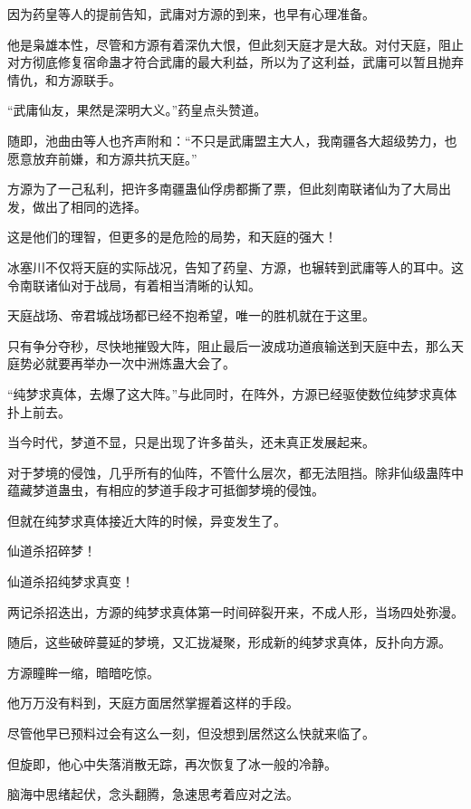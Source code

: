 
\begin{this_body}

因为药皇等人的提前告知，武庸对方源的到来，也早有心理准备。

他是枭雄本性，尽管和方源有着深仇大恨，但此刻天庭才是大敌。对付天庭，阻止对方彻底修复宿命蛊才符合武庸的最大利益，所以为了这利益，武庸可以暂且抛弃情仇，和方源联手。

“武庸仙友，果然是深明大义。”药皇点头赞道。

随即，池曲由等人也齐声附和：“不只是武庸盟主大人，我南疆各大超级势力，也愿意放弃前嫌，和方源共抗天庭。”

方源为了一己私利，把许多南疆蛊仙俘虏都撕了票，但此刻南联诸仙为了大局出发，做出了相同的选择。

这是他们的理智，但更多的是危险的局势，和天庭的强大！

冰塞川不仅将天庭的实际战况，告知了药皇、方源，也辗转到武庸等人的耳中。这令南联诸仙对于战局，有着相当清晰的认知。

天庭战场、帝君城战场都已经不抱希望，唯一的胜机就在于这里。

只有争分夺秒，尽快地摧毁大阵，阻止最后一波成功道痕输送到天庭中去，那么天庭势必就要再举办一次中洲炼蛊大会了。

“纯梦求真体，去爆了这大阵。”与此同时，在阵外，方源已经驱使数位纯梦求真体扑上前去。

当今时代，梦道不显，只是出现了许多苗头，还未真正发展起来。

对于梦境的侵蚀，几乎所有的仙阵，不管什么层次，都无法阻挡。除非仙级蛊阵中蕴藏梦道蛊虫，有相应的梦道手段才可抵御梦境的侵蚀。

但就在纯梦求真体接近大阵的时候，异变发生了。

仙道杀招碎梦！

仙道杀招纯梦求真变！

两记杀招迭出，方源的纯梦求真体第一时间碎裂开来，不成人形，当场四处弥漫。

随后，这些破碎蔓延的梦境，又汇拢凝聚，形成新的纯梦求真体，反扑向方源。

方源瞳眸一缩，暗暗吃惊。

他万万没有料到，天庭方面居然掌握着这样的手段。

尽管他早已预料过会有这么一刻，但没想到居然这么快就来临了。

但旋即，他心中失落消散无踪，再次恢复了冰一般的冷静。

脑海中思绪起伏，念头翻腾，急速思考着应对之法。


\end{this_body}
